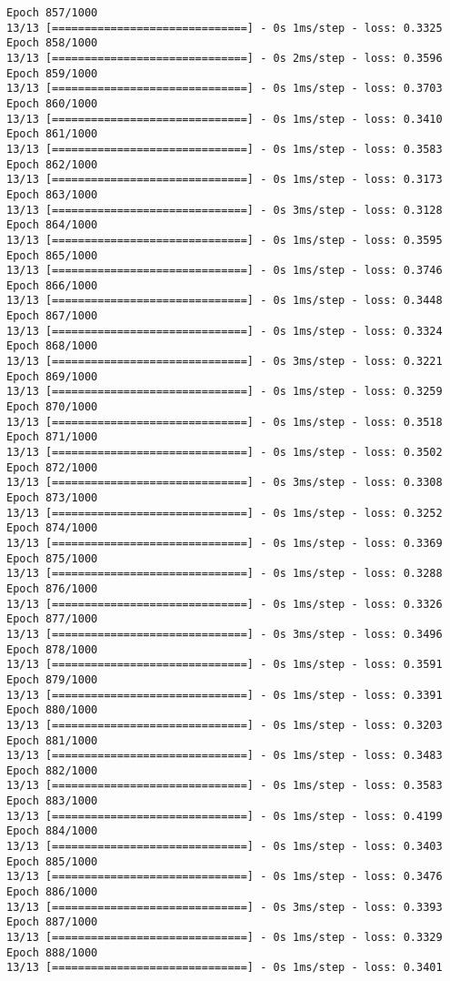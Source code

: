 \documentclass[11pt]{article}
\begin{document}
\begin{Verbatim}[commandchars=\\\{\}]
Epoch 857/1000
13/13 [==============================] - 0s 1ms/step - loss: 0.3325
Epoch 858/1000
13/13 [==============================] - 0s 2ms/step - loss: 0.3596
Epoch 859/1000
13/13 [==============================] - 0s 1ms/step - loss: 0.3703
Epoch 860/1000
13/13 [==============================] - 0s 1ms/step - loss: 0.3410
Epoch 861/1000
13/13 [==============================] - 0s 1ms/step - loss: 0.3583
Epoch 862/1000
13/13 [==============================] - 0s 1ms/step - loss: 0.3173
Epoch 863/1000
13/13 [==============================] - 0s 3ms/step - loss: 0.3128
Epoch 864/1000
13/13 [==============================] - 0s 1ms/step - loss: 0.3595
Epoch 865/1000
13/13 [==============================] - 0s 1ms/step - loss: 0.3746
Epoch 866/1000
13/13 [==============================] - 0s 1ms/step - loss: 0.3448
Epoch 867/1000
13/13 [==============================] - 0s 1ms/step - loss: 0.3324
Epoch 868/1000
13/13 [==============================] - 0s 3ms/step - loss: 0.3221
Epoch 869/1000
13/13 [==============================] - 0s 1ms/step - loss: 0.3259
Epoch 870/1000
13/13 [==============================] - 0s 1ms/step - loss: 0.3518
Epoch 871/1000
13/13 [==============================] - 0s 1ms/step - loss: 0.3502
Epoch 872/1000
13/13 [==============================] - 0s 3ms/step - loss: 0.3308
Epoch 873/1000
13/13 [==============================] - 0s 1ms/step - loss: 0.3252
Epoch 874/1000
13/13 [==============================] - 0s 1ms/step - loss: 0.3369
Epoch 875/1000
13/13 [==============================] - 0s 1ms/step - loss: 0.3288
Epoch 876/1000
13/13 [==============================] - 0s 1ms/step - loss: 0.3326
Epoch 877/1000
13/13 [==============================] - 0s 3ms/step - loss: 0.3496
Epoch 878/1000
13/13 [==============================] - 0s 1ms/step - loss: 0.3591
Epoch 879/1000
13/13 [==============================] - 0s 1ms/step - loss: 0.3391
Epoch 880/1000
13/13 [==============================] - 0s 1ms/step - loss: 0.3203
Epoch 881/1000
13/13 [==============================] - 0s 1ms/step - loss: 0.3483
Epoch 882/1000
13/13 [==============================] - 0s 1ms/step - loss: 0.3583
Epoch 883/1000
13/13 [==============================] - 0s 1ms/step - loss: 0.4199
Epoch 884/1000
13/13 [==============================] - 0s 1ms/step - loss: 0.3403
Epoch 885/1000
13/13 [==============================] - 0s 1ms/step - loss: 0.3476
Epoch 886/1000
13/13 [==============================] - 0s 3ms/step - loss: 0.3393
Epoch 887/1000
13/13 [==============================] - 0s 1ms/step - loss: 0.3329
Epoch 888/1000
13/13 [==============================] - 0s 1ms/step - loss: 0.3401

\end{Verbatim}
\end{document}
